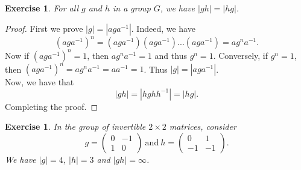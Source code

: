 \documentclass[a4paper, 11pt]{book}
\theoremstyle{plain}
\newtheorem{exercise}[theorem]{Exercise}
\theoremstyle{plain}
\begin{document}
\begin{exercise}
For all $g$ and $h$ in a group $G$, we have $|gh|=|hg|$.
\end{exercise}
\begin{proof}
First we prove $|g| = |aga^{-1}|$. Indeed, we have
$$(aga^{-1})^n = (aga^{-1})(aga^{-1})...(aga^{-1}) = ag^n a^{-1}.$$
Now if $(aga^{-1})^n=1$, then $ag^na^{-1}=1$ and thus $g^n=1$. Conversely, if $g^n=1$, then $(aga^{-1})^n = ag^na^{-1}=aa^{-1}=1$. Thus $|g| = |aga^{-1}|$.\\
Now, we have that
$$|gh| = |hghh^{-1}| = |hg|.$$
Completing the proof.
\end{proof}

\begin{exercise}
In the group of invertible $2\times 2$ matrices, consider
$$g=\left(\begin{array}{cc}
0 & -1\\ 1 & 0
\end{array}\right)~\text{and}~h=\left(\begin{array}{cc}
0 & 1\\ -1 & -1
\end{array}\right).$$
We have $|g|=4$, $|h|=3$ and $|gh|=\infty$.
\end{exercise}
\end{document}
